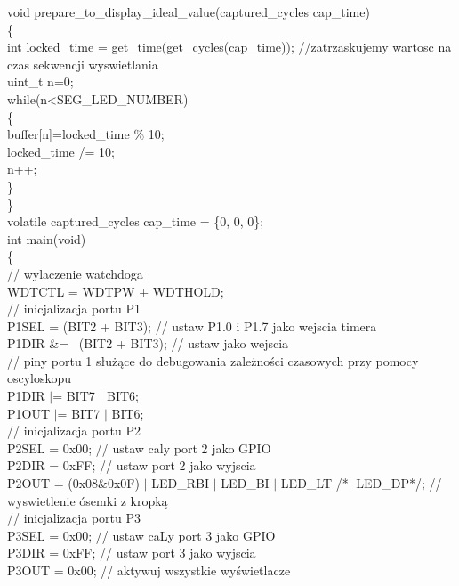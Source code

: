 \documentclass[a4paper,titlepage,11pt,floatssmall]{mwrep}
\begin{document}
\noindent void prepare\_{}to\_{}display\_{}ideal\_{}value(captured\_{}cycles cap\_{}time)\\
\{\\
    	int locked\_{}time = get\_{}time(get\_{}cycles(cap\_{}time)); //zatrzaskujemy wartosc na czas sekwencji wyswietlania\\

        uint\_{}t n=0;\\
		while(n<SEG\_{}LED\_{}NUMBER)\\
		\{\\
			buffer[n]=locked\_{}time \% 10;\\
			locked\_{}time /= 10;\\
			n++;\\
		\}\\
\}\\

\noindent volatile captured\_{}cycles cap\_{}time = \{0, 0, 0\};\\



\noindent int main(void)\\
\{\\
	// wylaczenie watchdoga\\
    WDTCTL = WDTPW + WDTHOLD; \\

    // inicjalizacja portu P1\\
    P1SEL = (BIT2 + BIT3); // ustaw P1.0 i P1.7 jako wejscia timera\\
    P1DIR \&= ~(BIT2 + BIT3); // ustaw jako wejscia\\
    // piny portu 1 służące do debugowania zależności czasowych przy pomocy oscyloskopu\\
    P1DIR $\vert$= BIT7 $\vert$ BIT6;\\
    P1OUT $\vert$= BIT7 $\vert$ BIT6;\\
	
    // inicjalizacja portu P2\\
    P2SEL = 0x00; // ustaw caly port 2 jako GPIO\\
    P2DIR = 0xFF; // ustaw port 2 jako wyjscia\\
    P2OUT =  (0x08\&0x0F) $\vert$ LED\_{}RBI $\vert$ LED\_{}BI $\vert$ LED\_{}LT /*$\vert$ LED\_{}DP*/; // wyswietlenie ósemki z kropką\\

    // inicjalizacja portu P3\\
    P3SEL = 0x00; // ustaw caLy port 3 jako GPIO\\
    P3DIR = 0xFF; // ustaw port 3 jako wyjscia\\
    P3OUT = 0x00; // aktywuj wszystkie wyświetlacze\\
\end{document}
